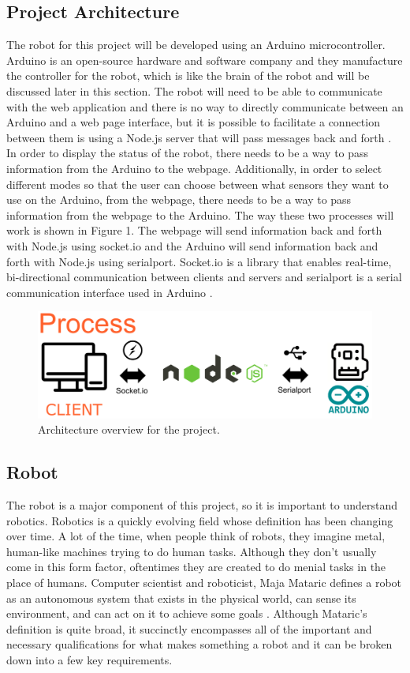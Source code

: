 \documentclass[10pt,twocolumn]{article}
\begin{document}
\subsection{Project Architecture}
The robot for this project will be developed using an Arduino microcontroller. Arduino is an open-source hardware and software company and they manufacture the controller for the robot, which is like the brain of the robot and will be discussed later in this section. The robot will need to be able to communicate with the web application and there is no way to directly communicate between an Arduino and a web page interface, but it is possible to facilitate a connection between them is using a Node.js server that will pass messages back and forth \cite{Thomas2020Communicating}. In order to display the status of the robot, there needs to be a way to pass information from the Arduino to the webpage. Additionally, in order to select different modes so that the user can choose between what sensors they want to use on the Arduino, from the webpage, there needs to be a way to pass information from the webpage to the Arduino. The way these two processes will work is shown in Figure 1. The webpage will send information  back and forth with Node.js using socket.io and the Arduino will send information back and forth with Node.js using serialport. Socket.io is a library that enables real-time, bi-directional communication between clients and servers and serialport is a serial communication interface used in Arduino \cite{Fitzgerald2015Arduino}.

\begin{figure}
    \centering
    \includegraphics[width=.95\linewidth]{Figure 1.png}
    \caption{
        Architecture overview for the project.
    }
    \label{fig:first-page}
\end{figure}

\subsection{Robot}
The robot is a major component of this project, so it is important to understand robotics. Robotics is a quickly evolving field whose definition has been changing over time. A lot of the time, when people think of robots, they imagine metal, human-like machines trying to do human tasks. Although they don’t usually come in this form factor, oftentimes they are created to do menial tasks in the place of humans. Computer scientist and roboticist, Maja Mataric defines a robot as an autonomous system that exists in the physical world, can sense its environment, and can act on it to achieve some goals \cite{Mataric2007TheRoboticsPrimer}. Although Mataric’s definition is quite broad, it succinctly encompasses all of the important and necessary qualifications for what makes something a robot and it can be broken down into a few key requirements. 
\end{document}
